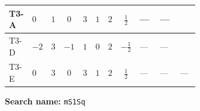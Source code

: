 \documentclass[8pt]{article}
\begin{document}
\begin{landscape}
\begin{longtable}{@{}llcccccc >{\raggedright\arraybackslash}p{0.21\linewidth} >{\raggedright\arraybackslash}p{0.21\linewidth} >{\raggedright\arraybackslash}p{0.21\linewidth}@{}}
\midrule
T3-A & $0$ & $1$ & $0$ & $3$ & $1$ & $2$ & $\frac{1}{2}$ & --- & --- & \scriptsize\adjustbox{max width=\linewidth}{$\begin{gathered} 6 {\lambda_{12}} {m_{S_2}^2}\end{gathered}$} \\
\midrule
T3-D & $-2$ & $3$ & $-1$ & $1$ & $0$ & $2$ & $-\frac{1}{2}$ & --- & --- & \scriptsize\adjustbox{max width=\linewidth}{$\begin{gathered} +2 {\lambda_{12}} {m_{S_2}^2}\end{gathered}$} \\
\midrule
T3-E & $0$ & $3$ & $0$ & $3$ & $1$ & $2$ & $\frac{1}{2}$ & --- & --- & --- \\
\midrule
\bottomrule
\end{longtable}
\clearpage
\noindent\textbf{Search name: }\texttt{mS1Sq}\par\smallskip

\end{landscape}
\end{document}
